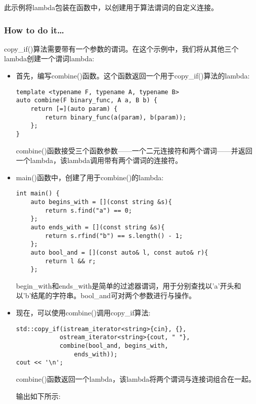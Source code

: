 
此示例将lambda包装在函数中，以创建用于算法谓词的自定义连接。

\subsubsection{How to do it…}

copy\_if()算法需要带有一个参数的谓词。在这个示例中，我们将从其他三个lambda创建一个谓词lambda:

\begin{itemize}
\item 
首先，编写combine()函数。这个函数返回一个用于copy\_if()算法的lambda:

\begin{lstlisting}[style=styleCXX]
template <typename F, typename A, typename B>
auto combine(F binary_func, A a, B b) {
	return [=](auto param) {
		return binary_func(a(param), b(param));
	};
}
\end{lstlisting}

combine()函数接受三个函数参数——一个二元连接符和两个谓词——并返回一个lambda，该lambda调用带有两个谓词的连接符。

\item 
main()函数中，创建了用于combine()的lambda:

\begin{lstlisting}[style=styleCXX]
int main() {
	auto begins_with = [](const string &s){
		return s.find("a") == 0;
	};
	auto ends_with = [](const string &s){
		return s.rfind("b") == s.length() - 1;
	};
	auto bool_and = [](const auto& l, const auto& r){
		return l && r;
	};
\end{lstlisting}

begin\_with和ends\_with是简单的过滤器谓词，用于分别查找以'a'开头和以'b'结尾的字符串。bool\_and可对两个参数进行与操作。

\item 
现在，可以使用combine()调用copy\_if算法:

\begin{lstlisting}[style=styleCXX]
std::copy_if(istream_iterator<string>{cin}, {},
			ostream_iterator<string>{cout, " "},
			combine(bool_and, begins_with,
				ends_with));
cout << '\n';
\end{lstlisting}

combine()函数返回一个lambda，该lambda将两个谓词与连接词组合在一起。

输出如下所示:

\end{itemize}

